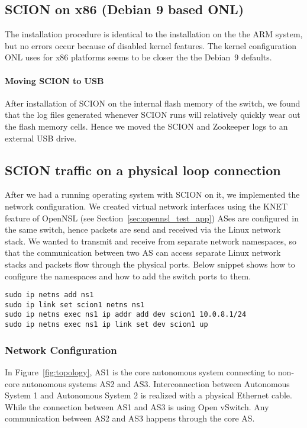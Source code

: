 \documentclass[a4paper]{article}
\begin{document}

\subsection{SCION on x86 (Debian 9 based ONL)}
The installation procedure is identical to the installation on the the ARM system, but no errors occur because of disabled kernel features. The kernel configuration ONL uses for x86 platforms seems to be closer the the Debian~9 defaults.

\paragraph{Moving SCION to USB}
After installation of SCION on the internal flash memory of the switch, we found that the log files generated whenever SCION runs will relatively quickly wear out the flash memory cells. Hence we moved the SCION and Zookeeper logs to an external USB drive.


\subsection{SCION traffic on a physical loop connection}
After we had a running operating system with SCION on it, we implemented the network configuration. We created virtual network interfaces using the KNET feature of OpenNSL (see Section~\ref{sec:opennsl_test_app}) ASes are configured in the same switch, hence packets are send and received via the Linux network stack. We wanted to transmit and receive from separate network namespaces, so that the communication between two AS can access separate Linux network stacks and packets flow through the physical ports. Below snippet shows how to configure the namespaces and how to add the switch ports to them.
\begin{lstlisting}
sudo ip netns add ns1
sudo ip link set scion1 netns ns1
sudo ip netns exec ns1 ip addr add dev scion1 10.0.8.1/24
sudo ip netns exec ns1 ip link set dev scion1 up
\end{lstlisting}

\subsubsection{Network Configuration}
In Figure~\ref{fig:topology}, AS1 is the core autonomous system connecting to non-core autonomous systems AS2 and AS3. Interconnection between Autonomous System 1 and Autonomous System 2 is realized with a physical Ethernet cable. While the connection between AS1 and AS3 is using Open vSwitch. Any communication between AS2 and AS3 happens through the core AS.
\end{document}
